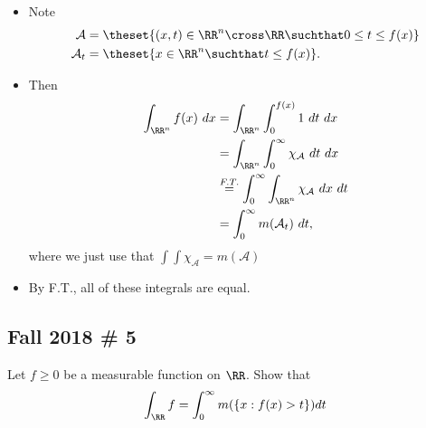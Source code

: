 \begin{solution}
\begin{itemize}
\item
  Note \begin{align*}
  \mathcal{A} &= \theset{(x, t) \in \RR^n\cross \RR \suchthat 0 \leq t \leq f(x)} 
  \\
  \mathcal{A}_t &= \theset{x
  \in \RR^n \suchthat t\leq f(x) }
  .\end{align*}
\item
  Then \begin{align*}
  \int_{\RR^n} f(x) ~dx 
  &= \int_{\RR^n} \int_0^{f(x)} 1 ~dt~dx \\
  &= \int_{\RR^n} \int_{0}^\infty \chi_\mathcal{A} ~dt~dx \\
  &\overset{F.T.}= \int_{0}^\infty \int_{\RR^n} \chi_\mathcal{A} ~dx~dt\\
  &= \int_0^\infty m(\mathcal{A}_t) ~dt
  ,\end{align*} where we just use that
  \(\int \int \chi_\mathcal{A} = m(\mathcal{A})\)
\item
  By F.T., all of these integrals are equal.
\end{itemize}

\end{solution}

\hypertarget{fall-2018-5}{%
\subsection{Fall 2018 \# 5}\label{fall-2018-5}}

Let \(f \geq 0\) be a measurable function on \(\RR\). Show that
\begin{align*}
\int _{\RR} f = \int _{0}^{\infty} m(\{x: f(x)>t\}) dt
\end{align*}

